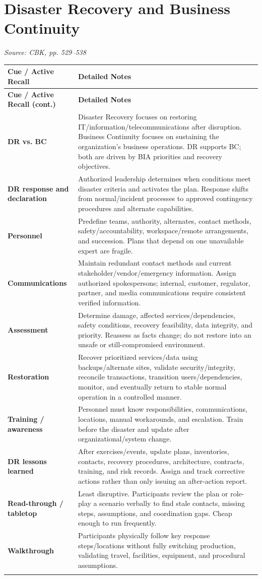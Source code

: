 \documentclass[10pt,letterpaper]{article}
\makeatletter
\newenvironment{cornell}{\rowcolors{2}{white}{notebg}\begin{longtable}{@{}>{\raggedright\arraybackslash\columncolor{cuebg}\color{navy}\bfseries}p{0.285\textwidth}>{\raggedright\arraybackslash}p{0.65\textwidth}@{}}\rowcolor{navy}\color{white}\textbf{Cue / Active Recall} & \color{white}\textbf{Detailed Notes}\\ \hline\endfirsthead\rowcolor{navy}\color{white}\textbf{Cue / Active Recall (cont.)} & \color{white}\textbf{Detailed Notes}\\ \hline\endhead}{\end{longtable}}
\newcommand{\noterow}[2]{#1 & #2\\\arrayrulecolor{line}\hline}\newcommand{\source}[1]{\par{\footnotesize\color{teal}\textit{Source: CBK, #1}}\par}
\makeatother
\begin{document}
\section{\color{navy}Disaster Recovery and Business Continuity}
\source{pp. 529--538}
\begin{cornell}
\noterow{DR vs. BC}{Disaster Recovery focuses on restoring IT/information/telecommunications after disruption. Business Continuity focuses on sustaining the organization's business operations. DR supports BC; both are driven by BIA priorities and recovery objectives.}
\noterow{DR response and declaration}{Authorized leadership determines when conditions meet disaster criteria and activates the plan. Response shifts from normal/incident processes to approved contingency procedures and alternate capabilities.}
\noterow{Personnel}{Predefine teams, authority, alternates, contact methods, safety/accountability, workspace/remote arrangements, and succession. Plans that depend on one unavailable expert are fragile.}
\noterow{Communications}{Maintain redundant contact methods and current stakeholder/vendor/emergency information. Assign authorized spokespersons; internal, customer, regulator, partner, and media communications require consistent verified information.}
\noterow{Assessment}{Determine damage, affected services/dependencies, safety conditions, recovery feasibility, data integrity, and priority. Reassess as facts change; do not restore into an unsafe or still-compromised environment.}
\noterow{Restoration}{Recover prioritized services/data using backups/alternate sites, validate security/integrity, reconcile transactions, transition users/dependencies, monitor, and eventually return to stable normal operation in a controlled manner.}
\noterow{Training / awareness}{Personnel must know responsibilities, communications, locations, manual workarounds, and escalation. Train before the disaster and update after organizational/system change.}
\noterow{DR lessons learned}{After exercises/events, update plans, inventories, contacts, recovery procedures, architecture, contracts, training, and risk records. Assign and track corrective actions rather than only issuing an after-action report.}
\noterow{Read-through / tabletop}{Least disruptive. Participants review the plan or role-play a scenario verbally to find stale contacts, missing steps, assumptions, and coordination gaps. Cheap enough to run frequently.}
\noterow{Walkthrough}{Participants physically follow key response steps/locations without fully switching production, validating travel, facilities, equipment, and procedural assumptions.}

\end{cornell}
\end{document}
